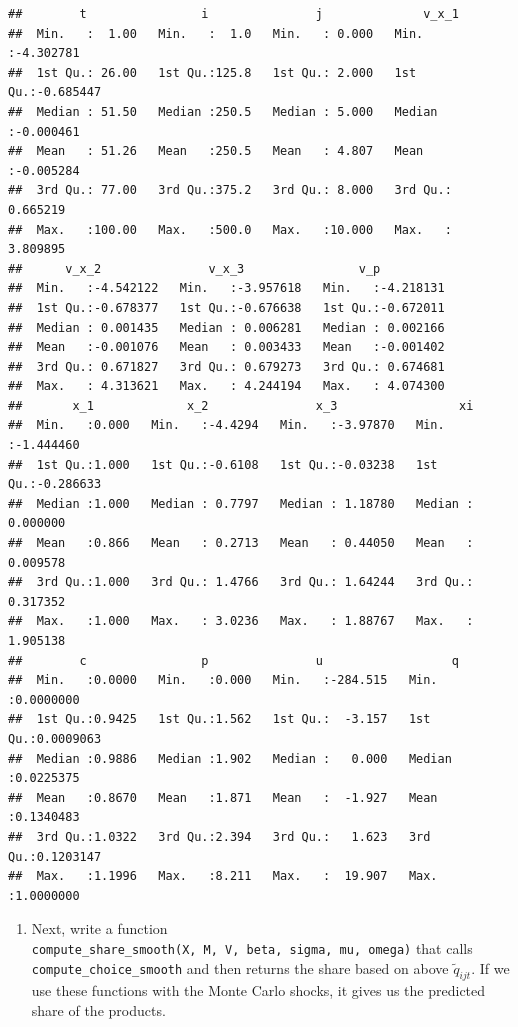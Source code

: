 \documentclass[]{book}
\providecommand{\tightlist}{%
  \setlength{\itemsep}{0pt}\setlength{\parskip}{0pt}}
\begin{document}
\begin{verbatim}
##        t                i               j              v_x_1          
##  Min.   :  1.00   Min.   :  1.0   Min.   : 0.000   Min.   :-4.302781  
##  1st Qu.: 26.00   1st Qu.:125.8   1st Qu.: 2.000   1st Qu.:-0.685447  
##  Median : 51.50   Median :250.5   Median : 5.000   Median :-0.000461  
##  Mean   : 51.26   Mean   :250.5   Mean   : 4.807   Mean   :-0.005284  
##  3rd Qu.: 77.00   3rd Qu.:375.2   3rd Qu.: 8.000   3rd Qu.: 0.665219  
##  Max.   :100.00   Max.   :500.0   Max.   :10.000   Max.   : 3.809895  
##      v_x_2               v_x_3                v_p           
##  Min.   :-4.542122   Min.   :-3.957618   Min.   :-4.218131  
##  1st Qu.:-0.678377   1st Qu.:-0.676638   1st Qu.:-0.672011  
##  Median : 0.001435   Median : 0.006281   Median : 0.002166  
##  Mean   :-0.001076   Mean   : 0.003433   Mean   :-0.001402  
##  3rd Qu.: 0.671827   3rd Qu.: 0.679273   3rd Qu.: 0.674681  
##  Max.   : 4.313621   Max.   : 4.244194   Max.   : 4.074300  
##       x_1             x_2               x_3                 xi           
##  Min.   :0.000   Min.   :-4.4294   Min.   :-3.97870   Min.   :-1.444460  
##  1st Qu.:1.000   1st Qu.:-0.6108   1st Qu.:-0.03238   1st Qu.:-0.286633  
##  Median :1.000   Median : 0.7797   Median : 1.18780   Median : 0.000000  
##  Mean   :0.866   Mean   : 0.2713   Mean   : 0.44050   Mean   : 0.009578  
##  3rd Qu.:1.000   3rd Qu.: 1.4766   3rd Qu.: 1.64244   3rd Qu.: 0.317352  
##  Max.   :1.000   Max.   : 3.0236   Max.   : 1.88767   Max.   : 1.905138  
##        c                p               u                  q            
##  Min.   :0.0000   Min.   :0.000   Min.   :-284.515   Min.   :0.0000000  
##  1st Qu.:0.9425   1st Qu.:1.562   1st Qu.:  -3.157   1st Qu.:0.0009063  
##  Median :0.9886   Median :1.902   Median :   0.000   Median :0.0225375  
##  Mean   :0.8670   Mean   :1.871   Mean   :  -1.927   Mean   :0.1340483  
##  3rd Qu.:1.0322   3rd Qu.:2.394   3rd Qu.:   1.623   3rd Qu.:0.1203147  
##  Max.   :1.1996   Max.   :8.211   Max.   :  19.907   Max.   :1.0000000
\end{verbatim}

\begin{enumerate}
\def\labelenumi{\arabic{enumi}.}
\setcounter{enumi}{8}
\tightlist
\item
  Next, write a function
  \texttt{compute\_share\_smooth(X,\ M,\ V,\ beta,\ sigma,\ mu,\ omega)}
  that calls \texttt{compute\_choice\_smooth} and then returns the share
  based on above \(\tilde{q}_{ijt}\). If we use these functions with the
  Monte Carlo shocks, it gives us the predicted share of the products.
\end{enumerate}
\end{document}
